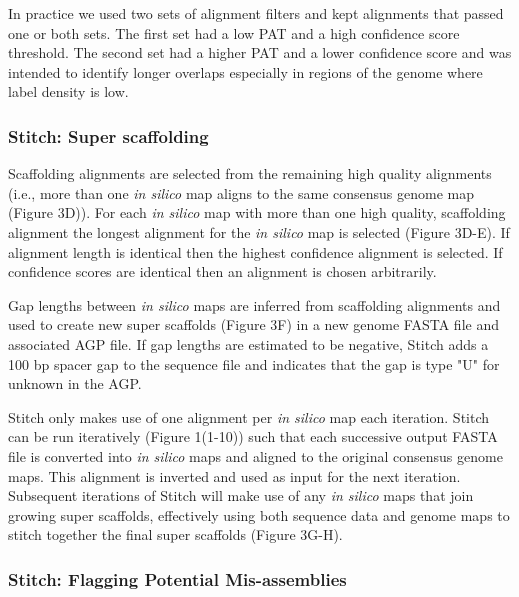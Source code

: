 \documentclass{bmcart}
\begin{document}
In practice we used two sets of alignment filters and kept alignments that passed one or both sets. The first set had a low PAT and a high confidence score threshold. The second set had a higher PAT and a lower confidence score and was intended to identify longer overlaps especially in regions of the genome where label density is low.

\subsubsection*{Stitch: Super scaffolding}

Scaffolding alignments are selected from the remaining high quality alignments (i.e., more than one \textit{in silico} map aligns to the same consensus genome map (Figure 3D)). For each \textit{in silico} map with more than one high quality, scaffolding alignment the longest alignment for the \textit{in silico} map is selected (Figure 3D-E). If alignment length is identical then the highest confidence alignment is selected. If confidence scores are identical then an alignment is chosen arbitrarily.

Gap lengths between \textit{in silico} maps are inferred from scaffolding alignments and used to create new super scaffolds (Figure 3F) in a new genome FASTA file and associated AGP file. If gap lengths are estimated to be negative, Stitch adds a 100 bp spacer gap to the sequence file and indicates that the gap is type "U" for unknown in the AGP. 

Stitch only makes use of one alignment per \textit{in silico} map each iteration. Stitch can be run iteratively (Figure 1(1-10)) such that each successive output FASTA file is converted into \textit{in silico} maps and aligned to the original consensus genome maps. This alignment is inverted and used as input for the next iteration. Subsequent iterations of Stitch will make use of any \textit{in silico} maps that join growing super scaffolds, effectively using both sequence data and genome maps to stitch together the final super scaffolds (Figure 3G-H). 

\subsubsection*{Stitch: Flagging Potential Mis-assemblies}
\end{document}
